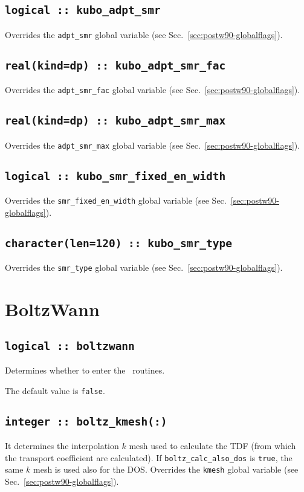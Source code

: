 \subsection[optics\_adpt\_smr]{\tt logical :: kubo\_adpt\_smr}
Overrides the \verb#adpt_smr# global variable (see
Sec.~\ref{sec:postw90-globalflags}).

\subsection[optics\_adpt\_smr\_fac]{\tt real(kind=dp) ::
  kubo\_adpt\_smr\_fac}
Overrides the \verb#adpt_smr_fac# global variable (see
Sec.~\ref{sec:postw90-globalflags}).

\subsection[optics\_adpt\_smr\_max]{\tt real(kind=dp) ::
  kubo\_adpt\_smr\_max}
Overrides the \verb#adpt_smr_max# global variable (see
Sec.~\ref{sec:postw90-globalflags}).

\subsection[optics\_smr\_fixed\_en\_width]{\tt logical :: 
kubo\_smr\_fixed\_en\_width}
Overrides the \verb#smr_fixed_en_width# global variable (see
Sec.~\ref{sec:postw90-globalflags}).

\subsection[optics\_smr\_type]{\tt  character(len=120) :: 
kubo\_smr\_type}
Overrides the \verb#smr_type# global variable (see
Sec.~\ref{sec:postw90-globalflags}).

\clearpage
\section{BoltzWann}
\subsection[boltzwann]{\tt logical :: boltzwann}
Determines whether to enter the \bw\ routines.

The default value is \verb#false#.

\subsection[boltz\_kmesh]{\tt integer :: boltz\_kmesh(:)}
It determines the interpolation $k$ mesh used to calculate the TDF (from which the transport coefficient are calculated). If {\tt boltz\_calc\_also\_dos} is \verb#true#, the same $k$ mesh is used also for the DOS.
Overrides the \verb#kmesh# global variable (see
Sec.~\ref{sec:postw90-globalflags}).

